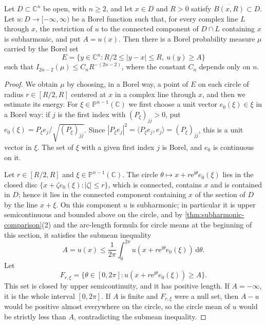 \begin{theorem}\label{thm:high-value-star-energy}
Let $D\subset\mathbb C^n$ be open, with $n\geq2$, and let $x\in D$ and $R>0$ satisfy $\overline{B(x,R)}\subset D$. Let $u\colon D\to[-\infty,\infty)$ be a Borel function such that, for every complex line $L$ through $x$, the restriction of $u$ to the connected component of $D\cap L$ containing $x$ is subharmonic, and put $A=u(x)$. Then there is a Borel probability measure $\mu$ carried by the Borel set
\[
 E=\{y\in\mathbb C^n:R/2\leq|y-x|\leq R,\ u(y)\geq A\}
\]
such that $I_{2n-2}(\mu)\leq C_nR^{-(2n-2)}$, where the constant $C_n$ depends only on $n$.
\end{theorem}
\begin{proof}
We obtain $\mu$ by choosing, in a Borel way, a point of $E$ on each circle of radius $r\in[R/2,R]$ centered at $x$ in a complex line through $x$, and then we estimate its energy. For $\xi\in\mathbb P^{n-1}(\mathbb C)$ we first choose a unit vector $e_0(\xi)\in\xi$ in a Borel way: if $j$ is the first index with $(P_\xi)_{jj}>0$, put $e_0(\xi)=P_\xi e_j/\sqrt{(P_\xi)_{jj}}$. Since $|P_\xi e_j|^2=\langle P_\xi e_j,e_j\rangle=(P_\xi)_{jj}$, this is a unit vector in $\xi$. The set of $\xi$ with a given first index $j$ is Borel, and $e_0$ is continuous on it.

Let $r\in[R/2,R]$ and $\xi\in\mathbb P^{n-1}(\mathbb C)$. The circle $\theta\mapsto x+r\mathrm e^{\mathrm i\theta}e_0(\xi)$ lies in the closed disc $\{x+\zeta e_0(\xi):|\zeta|\leq r\}$, which is connected, contains $x$ and is contained in $D$; hence it lies in the connected component containing $x$ of the section of $D$ by the line $x+\xi$. On this component $u$ is subharmonic; in particular it is upper semicontinuous and bounded above on the circle, and by \cref{thm:subharmonic-comparison}(2) and the arc-length formula for circle means at the beginning of this section, it satisfies the submean inequality
\[
 A=u(x)\leq\frac1{2\pi}\int_0^{2\pi}u(x+r\mathrm e^{\mathrm i\theta}e_0(\xi))\,\mathrm d\theta.
\]
Let
\[
 F_{r,\xi}=\{\theta\in[0,2\pi]:u(x+r\mathrm e^{\mathrm i\theta}e_0(\xi))\geq A\}.
\]
This set is closed by upper semicontinuity, and it has positive length. If $A=-\infty$, it is the whole interval $[0,2\pi]$. If $A$ is finite and $F_{r,\xi}$ were a null set, then $A-u$ would be positive almost everywhere on the circle, so the circle mean of $u$ would be strictly less than $A$, contradicting the submean inequality.


\end{proof}

